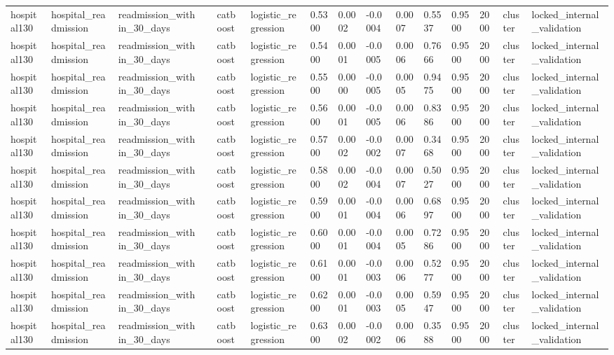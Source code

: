 \begin{tabular}{lllllllllllllll}
hospital130 & hospital\_readmission & readmission\_within\_30\_days &  & catboost & logistic\_regression & 0.5300 & 0.0002 & -0.0004 & 0.0007 & 0.5537 & 0.9500 & 2000 & cluster & locked\_internal\_validation \\
hospital130 & hospital\_readmission & readmission\_within\_30\_days &  & catboost & logistic\_regression & 0.5400 & 0.0001 & -0.0005 & 0.0006 & 0.7666 & 0.9500 & 2000 & cluster & locked\_internal\_validation \\
hospital130 & hospital\_readmission & readmission\_within\_30\_days &  & catboost & logistic\_regression & 0.5500 & 0.0000 & -0.0005 & 0.0005 & 0.9475 & 0.9500 & 2000 & cluster & locked\_internal\_validation \\
hospital130 & hospital\_readmission & readmission\_within\_30\_days &  & catboost & logistic\_regression & 0.5600 & 0.0001 & -0.0005 & 0.0006 & 0.8386 & 0.9500 & 2000 & cluster & locked\_internal\_validation \\
hospital130 & hospital\_readmission & readmission\_within\_30\_days &  & catboost & logistic\_regression & 0.5700 & 0.0002 & -0.0002 & 0.0007 & 0.3468 & 0.9500 & 2000 & cluster & locked\_internal\_validation \\
hospital130 & hospital\_readmission & readmission\_within\_30\_days &  & catboost & logistic\_regression & 0.5800 & 0.0002 & -0.0004 & 0.0007 & 0.5027 & 0.9500 & 2000 & cluster & locked\_internal\_validation \\
hospital130 & hospital\_readmission & readmission\_within\_30\_days &  & catboost & logistic\_regression & 0.5900 & 0.0001 & -0.0004 & 0.0006 & 0.6897 & 0.9500 & 2000 & cluster & locked\_internal\_validation \\
hospital130 & hospital\_readmission & readmission\_within\_30\_days &  & catboost & logistic\_regression & 0.6000 & 0.0001 & -0.0004 & 0.0005 & 0.7286 & 0.9500 & 2000 & cluster & locked\_internal\_validation \\
hospital130 & hospital\_readmission & readmission\_within\_30\_days &  & catboost & logistic\_regression & 0.6100 & 0.0001 & -0.0003 & 0.0006 & 0.5277 & 0.9500 & 2000 & cluster & locked\_internal\_validation \\
hospital130 & hospital\_readmission & readmission\_within\_30\_days &  & catboost & logistic\_regression & 0.6200 & 0.0001 & -0.0003 & 0.0005 & 0.5947 & 0.9500 & 2000 & cluster & locked\_internal\_validation \\
hospital130 & hospital\_readmission & readmission\_within\_30\_days &  & catboost & logistic\_regression & 0.6300 & 0.0002 & -0.0002 & 0.0006 & 0.3588 & 0.9500 & 2000 & cluster & locked\_internal\_validation \\

\end{tabular}
